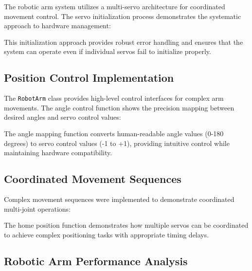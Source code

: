 \documentclass{book}
\begin{document}
\par\noindent The robotic arm system utilizes a multi-servo architecture for coordinated movement control. The servo initialization process demonstrates the systematic approach to hardware management:



\par\noindent This initialization approach provides robust error handling and ensures that the system can operate even if individual servos fail to initialize properly.

\subsection{Position Control Implementation}

\par\noindent The \texttt{RobotArm} class provides high-level control interfaces for complex arm movements. The angle control function shows the precision mapping between desired angles and servo control values:



\par\noindent The angle mapping function converts human-readable angle values (0-180 degrees) to servo control values (-1 to +1), providing intuitive control while maintaining hardware compatibility.

\subsection{Coordinated Movement Sequences}

\par\noindent Complex movement sequences were implemented to demonstrate coordinated multi-joint operations:



\par\noindent The home position function demonstrates how multiple servos can be coordinated to achieve complex positioning tasks with appropriate timing delays.

\subsection{Robotic Arm Performance Analysis}
\end{document}
